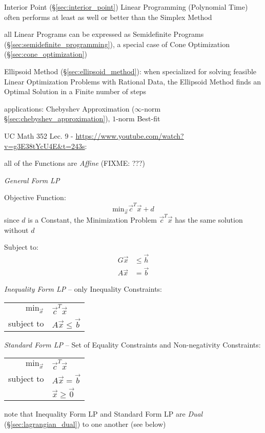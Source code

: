 Interior Point (\S\ref{sec:interior_point}) Linear Programming
(Polynomial Time) often performs at least as well or better than the Simplex
Method

all Linear Programs can be expressed as Semidefinite Programs
(\S\ref{sec:semidefinite_programming}), a special case of Cone Optimization
(\S\ref{sec:cone_optimization})

Ellipsoid Method (\S\ref{sec:ellipsoid_method}): when specialized for solving
feasible Linear Optimization Problems with Rational Data, the Ellipsoid Method
finds an Optimal Solution in a Finite number of steps

applications: Chebyshev Approximation ($\infty$-norm
\S\ref{sec:chebyshev_approximation}), $1$-norm Best-fit


UC Math 352 Lec. 9 - \url{https://www.youtube.com/watch?v=g3E38tYcU4E&t=243s}:

all of the Functions are \emph{Affine} (FIXME: ???)

\emph{General Form LP}

Objective Function:
\[
  \mathrm{min}_{\vec{x}} \vec{c}^T\vec{x} + d
\]
since $d$ is a Constant, the Minimization Problem $\vec{c}^T\vec{x}$ has the
same solution without $d$

Subject to:
\begin{align*}
  G\vec{x} & \leq \vec{h} \\
  A\vec{x} & = \vec{b}
\end{align*}

\emph{Inequality Form LP} -- only Inequality Constraints:

\begin{tabular}{r l}
  $\mathrm{min}_{\vec{x}}$ & $\vec{c}^T\vec{x}$      \\
  subject to               & $A\vec{x} \leq \vec{b}$ \\
\end{tabular}

\emph{Standard Form LP} -- Set of Equality Constraints and Non-negativity
Constraints:

\begin{tabular}{r l}
  $\mathrm{min}_{\vec{x}}$ & $\vec{c}^T\vec{x}$     \\
  subject to               & $A\vec{x} = \vec{b}$   \\
                           & $\vec{x} \geq \vec{0}$ \\
\end{tabular}

note that Inequality Form LP and Standard Form LP are \emph{Dual}
(\S\ref{sec:lagrangian_dual}) to one another (see below)

